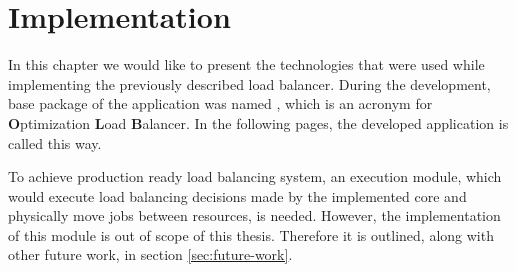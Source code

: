 \chapter{Implementation}\label{ch:implementation}
In this chapter we would like to present the technologies that were used while implementing the previously described load balancer.
During the development,
base package of the application was named ,
which is an acronym for \textbf{O}ptimization \textbf{L}oad \textbf{B}alancer.
In the following pages, 
the developed application is called this way.

To achieve production ready load balancing system, 
an execution module, which would execute load balancing decisions made by the implemented core and physically move jobs between resources,
is needed.
However,
the implementation of this module is out of scope of this thesis.
Therefore it is outlined, along with other future work, in section \ref{sec:future-work}.







